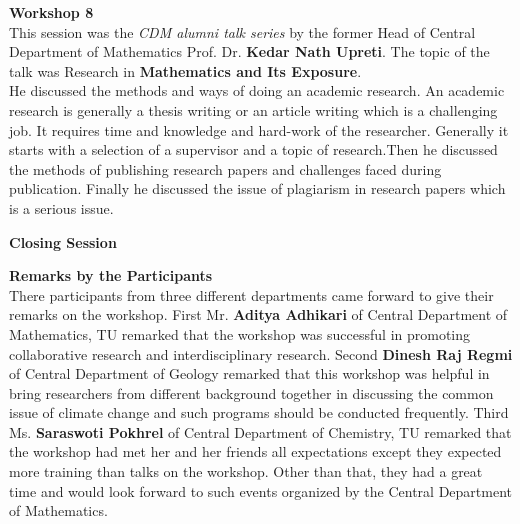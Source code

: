 \documentclass[a4paper,12pt]{report}
\begin{document}
\vspace{23mm}

{\bfseries \large Workshop 8}\\[3mm]
This session was the \textit{CDM alumni talk series} by the former Head of Central Department of Mathematics Prof. Dr. \textbf{Kedar Nath Upreti}. The topic of the talk was Research in \textbf{Mathematics and Its Exposure}.\\[3mm]
He discussed the methods and ways of doing an academic research. An academic research is generally a thesis writing or an article writing which is a challenging job. It requires time and knowledge and hard-work of the researcher. Generally it starts with a selection of a supervisor and a topic of research.Then he discussed the methods of publishing research papers and challenges faced during publication. Finally he discussed the issue of plagiarism in research papers which is a serious issue.
\clearpage

\begin{center}
  {\bfseries \Large Closing Session}
\end{center}
\vspace{5mm}

{\bfseries \large Remarks by the Participants}\\[3mm]
There participants from three different departments came forward to give their remarks on the workshop. First Mr. \textbf{Aditya Adhikari} of Central Department of Mathematics, TU remarked that the workshop was successful in promoting collaborative research and interdisciplinary research. Second \textbf{Dinesh Raj Regmi} of Central Department of Geology remarked that this workshop was helpful in bring researchers from different background together in discussing the common issue of climate change and such programs should be conducted frequently. Third Ms. \textbf{Saraswoti Pokhrel} of Central Department of Chemistry, TU remarked that the workshop had met her and her friends all expectations except they expected more training than talks on the workshop. Other than that, they had a great time and would look forward to such events organized by the Central Department of Mathematics.\\[5mm]
\end{document}

